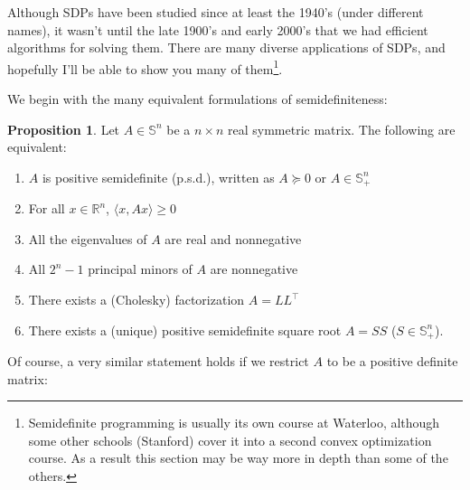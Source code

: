 \documentclass[11pt]{article}
\numberwithin{equation}{section}
\theoremstyle{definition}
\newtheorem{proposition}[theorem]{Proposition}
\newcommand{\bR}{\mathbb{R}}
\newcommand{\bS}{\mathbb{S}}
\begin{document}
Although SDPs have been studied since at least the 1940's (under different names), it wasn't until the late 1900's and early 2000's that we had efficient algorithms for solving them. There are many diverse applications of SDPs, and hopefully I'll be able to show you many of them\footnote{Semidefinite programming is usually its own course at Waterloo, although some other schools (Stanford) cover it into a second convex optimization course. As a result this section may be way more in depth than some of the others.}.

We begin with the many equivalent formulations of semidefiniteness:
\begin{proposition}
    Let $A\in\bS^n$ be a $n\times n$ real symmetric matrix. The following are equivalent:
    \begin{enumerate}[label=(\roman*)]
        \item $A$ is positive semidefinite (p.s.d.), written as $A\succeq 0$ or $A\in\bS_+^n$
        \item For all $x\in\bR^n$, $\langle x, Ax\rangle\ge0$
        \item All the eigenvalues of $A$ are real and nonnegative
        \item All $2^n-1$ principal minors of $A$ are nonnegative
        \item There exists a (Cholesky) factorization $A=LL^\top$
        \item There exists a (unique) positive semidefinite square root $A=SS$ ($S\in\bS_+^n$).
    \end{enumerate}
\end{proposition}
Of course, a very similar statement holds if we restrict $A$ to be a positive definite matrix:
\end{document}
